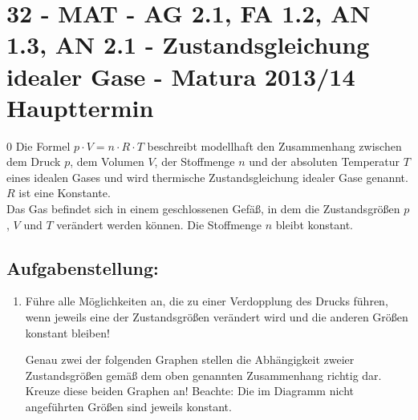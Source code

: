 \section{32 - MAT - AG 2.1, FA 1.2, AN 1.3, AN 2.1  - Zustandsgleichung idealer Gase - Matura 2013/14 Haupttermin}

\begin{langesbeispiel} \item[0] %
				Die Formel $p\cdot V=n\cdot R\cdot T$ beschreibt modellhaft den Zusammenhang zwischen dem Druck $p$, dem Volumen $V$, der Stoffmenge $n$ und der absoluten Temperatur $T$ eines idealen Gases und wird thermische Zustandsgleichung idealer Gase genannt. $R$ ist eine Konstante.\\ 
				Das Gas befindet sich in einem geschlossenen Gefäß, in dem die Zustandsgrößen $p$, $V$ und $T$ verändert werden können. Die Stoffmenge $n$ bleibt konstant.

\subsection{Aufgabenstellung:}
\begin{enumerate}
	\item  Führe alle Möglichkeiten an, die zu einer Verdopplung des Drucks führen, wenn jeweils eine der Zustandsgrößen verändert wird und die anderen Größen konstant bleiben!
	
 Genau zwei der folgenden Graphen stellen die Abhängigkeit zweier Zustandsgrößen gemäß dem oben genannten Zusammenhang richtig dar. Kreuze diese beiden Graphen an!  Beachte: Die im Diagramm nicht angeführten Größen sind jeweils konstant.


\end{enumerate}
\end{langesbeispiel}
